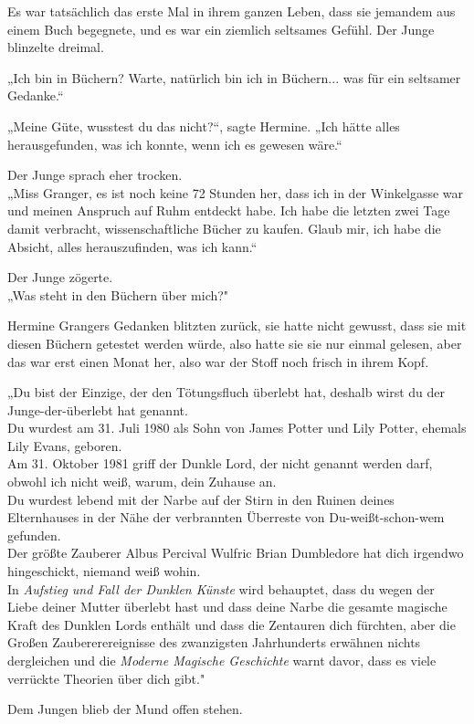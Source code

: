{Es war tatsächlich das erste Mal in ihrem ganzen Leben, dass sie jemandem aus einem Buch begegnete, und es war ein ziemlich seltsames Gefühl. Der Junge blinzelte dreimal.

„Ich bin in Büchern? Warte, natürlich bin ich in Büchern... was für ein seltsamer Gedanke.“

„Meine Güte, wusstest du das nicht?“, sagte Hermine. „Ich hätte alles herausgefunden, was ich konnte, wenn ich es gewesen wäre.“

Der Junge sprach eher trocken.\\ „Miss Granger, es ist noch keine 72 Stunden her, dass ich in der Winkelgasse war und meinen Anspruch auf Ruhm entdeckt habe. Ich habe die letzten zwei Tage damit verbracht, wissenschaftliche Bücher zu kaufen. Glaub mir, ich habe die Absicht, alles herauszufinden, was ich kann.“

Der Junge zögerte.\\ „Was steht in den Büchern über mich?"

Hermine Grangers Gedanken blitzten zurück, sie hatte nicht gewusst, dass sie mit diesen Büchern getestet werden würde, also hatte sie sie nur einmal gelesen, aber das war erst einen Monat her, also war der Stoff noch frisch in ihrem Kopf.

„Du bist der Einzige, der den Tötungsfluch überlebt hat, deshalb wirst du der Junge-der-überlebt hat genannt.\\ Du wurdest am 31. Juli 1980 als Sohn von James Potter und Lily Potter, ehemals Lily Evans, geboren.\\ Am 31. Oktober 1981 griff der Dunkle Lord, der nicht genannt werden darf, obwohl ich nicht weiß, warum, dein Zuhause an.\\ Du wurdest lebend mit der Narbe auf der Stirn in den Ruinen deines Elternhauses in der Nähe der verbrannten Überreste von Du-weißt-schon-wem gefunden.\\ Der größte Zauberer Albus Percival Wulfric Brian Dumbledore hat dich irgendwo hingeschickt, niemand weiß wohin.\\ In \emph{Aufstieg und Fall der Dunklen Künste} wird behauptet, dass du wegen der Liebe deiner Mutter überlebt hast und dass deine Narbe die gesamte magische Kraft des Dunklen Lords enthält und dass die Zentauren dich fürchten, aber die Großen Zaubererereignisse des zwanzigsten Jahrhunderts erwähnen nichts dergleichen und die \emph{Moderne Magische Geschichte} warnt davor, dass es viele verrückte Theorien über dich gibt."

Dem Jungen blieb der Mund offen stehen.

}
